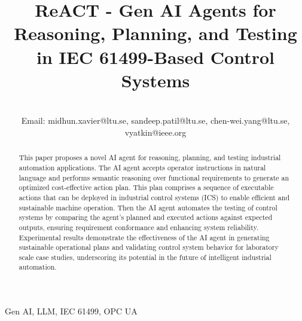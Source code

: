 \documentclass[conference]{IEEEtran}
\begin{document}
\title{ReACT - Gen AI Agents for Reasoning, Planning, and Testing in IEC 61499-Based Control Systems}


\author{








\\ Email: midhun.xavier@ltu.se, sandeep.patil@ltu.se, chen-wei.yang@ltu.se,  vyatkin@ieee.org
}

\maketitle

\begin{abstract}


This paper proposes a novel AI agent for reasoning, planning, and testing industrial automation applications. The AI agent accepts operator instructions in natural language and performs semantic reasoning over functional requirements to generate an optimized cost-effective action plan. This plan comprises a sequence of executable actions that can be deployed in industrial control systems (ICS) to enable efficient and sustainable machine operation. Then the AI agent automates the testing of control systems by comparing the agent's planned and executed actions against expected outputs, ensuring requirement conformance and enhancing system reliability. Experimental results demonstrate the effectiveness of the AI agent in generating sustainable operational plans and validating control system behavior for laboratory scale case studies, underscoring its potential in the future of intelligent industrial automation.

\end{abstract}

\begin{IEEEkeywords}
Gen AI, LLM, IEC 61499, OPC UA

\end{IEEEkeywords}
\end{document}
